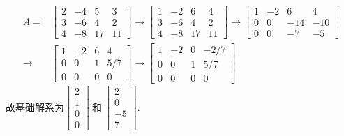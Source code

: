 \begin{displaymath}
\begin{aligned}
A=&\begin{bmatrix}2&-4&5&3\\3&-6&4&2\\4&-8&17&11\end{bmatrix}\rightarrow
\begin{bmatrix}1&-2&6&4\\3&-6&4&2\\4&-8&17&11  \end{bmatrix}\rightarrow
\begin{bmatrix}1&-2&6&4\\0&0&-14&-10\\0&0&-7&-5  \end{bmatrix}\\ \rightarrow &
\begin{bmatrix}1&-2&6&4\\0&0&1&5/7\\0&0&0&0  \end{bmatrix}\rightarrow
\begin{bmatrix}1&-2&0&-2/7\\0&0&1&5/7\\0&0&0&0  \end{bmatrix}
\end{aligned}
\end{displaymath}
故基础解系为$\begin{bmatrix}2\\1\\0\\0\end{bmatrix}\ \mbox{和}\ \begin{bmatrix}2\\0\\-5\\7\end{bmatrix} .$

